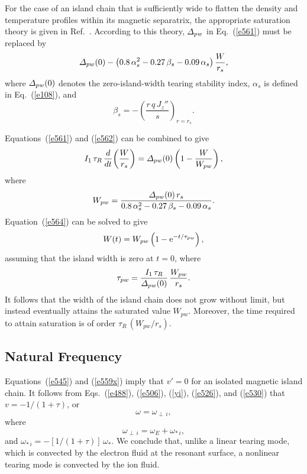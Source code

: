 \documentclass[12pt,prb,aps]{revtex4-1}
\begin{document}
For the case of an island chain that is sufficiently wide to flatten  the density and temperature profiles within its magnetic separatrix, the appropriate saturation theory is given in Ref.~.
According to this theory, ${\mit\Delta}_{pw}$ in Eq.~(\ref{e561}) must be replaced by
\begin{equation}\label{e562}
{\mit\Delta}_{pw}(0) - \left(0.8\,\alpha_s^{2}-0.27\,\beta_s - 0.09\,\alpha_s\right)\frac{W}{r_s},
\end{equation}
where ${\mit\Delta}_{pw}(0)$ denotes the zero-island-width tearing stability index, $\alpha_s$ is defined in  Eq.~(\ref{e108}),
and
\begin{equation}
\beta_s = -\left(\frac{r\,q\,J_z''}{s}\right)_{r=r_s}.
\end{equation}

Equations~(\ref{e561}) and (\ref{e562}) can be combined to give
\begin{equation}\label{e564}
I_1\,\tau_R\,\frac{d}{dt}\!\left(\frac{W}{r_s}\right)= {\mit\Delta}_{pw}(0)\left(1-\frac{W}{W_{pw}}\right),
\end{equation}
where
\begin{align}
W_{pw} = \frac{{\mit\Delta}_{pw}(0)\,r_s}{0.8\,\alpha_s^{2}-0.27\,\beta_s - 0.09\,\alpha_s}.
\end{align}
Equation~(\ref{e564}) can be solved to give
\begin{equation}
W(t) = W_{pw}\left(1-{\rm e}^{-t/\tau_{pw}}\right),
\end{equation}
assuming that the island width is zero at $t=0$,
where
\begin{equation}
\tau_{pw} = \frac{I_1\,\tau_R}{{\mit\Delta}_{pw}(0)}\,\frac{W_{pw}}{r_s}.
\end{equation}
It follows that the width of the island chain does not grow without limit, 
but instead eventually attains the saturated 
value $W_{pw}$. Moreover, the time required to attain saturation is of order $\tau_R\,(W_{pw}/r_s)$. 

\subsection{Natural Frequency}\label{sphase1}
Equations~(\ref{e545}) and (\ref{e559x}) imply that 
$v'=0$ 
for an isolated magnetic island chain. It follows from
 Eqs.~(\ref{e488}), (\ref{e506}), (\ref{yi}), (\ref{e526}), and (\ref{e530}) that $v=-1/(1+\tau)$, or
 \begin{equation}
\omega= \omega_{\perp\,i},
\end{equation}
where
\begin{equation}
\omega_{\perp\,i} = \omega_E + \omega_{\ast\,i},
\end{equation}
and
$\omega_{\ast\,i} = -[1/(1+\tau)]\,\omega_\ast$.
We conclude that, unlike a linear tearing mode, which is convected by the electron fluid at the resonant surface,\cite{ara} a nonlinear
tearing mode is convected by the  ion  fluid.\cite{fw} 
\end{document}

